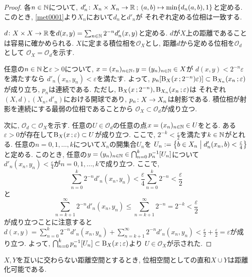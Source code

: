 \documentclass[uplatex, dvipdfmx, a4paper, 12pt, class=jsbook, crop=false]{standalone}
\begin{document}
\begin{proof}
	各$ n \in \mathbb{N} $について, $ \morphto{d'_n}{X_n \times X_n}{\R}
	{(a,b)}{\min\lrbrace{d_n(a,b), 1}} $と定める.
	このとき, \cref{met0001}より$ X_n $において$ d_n $と$ d'_n $が
	それぞれ定める位相は一致する.

	$ d\colon X \times X\to\mathbb{R} $を$ d(x, y) = \sum_{n \in \mathbb{N}}
	2^{-n} d'_n(x, y) $と定める.
	$ d $が$ X $上の距離であることは容易に確かめられる.
	$ X $に定まる積位相を$ \mathcal{O}_X $とし,
	距離$ d $から定める位相を$ \mathcal{O}_d $として
	$ \mathcal{O}_X = \mathcal{O}_d $を示す.

	任意の$ n \in \mathbb{N} $と$ \varepsilon > 0 $について,
	$ x=(x_n)_{n \in \mathbb{N}}, y=(y_n)_{n \in \mathbb{N}} \in X $が
	$ d(x, y) < 2^{-n}\varepsilon $を満たすなら
	$ d'_n(x_n, y_n) < \varepsilon $を満たす.
	よって, $ \mapset{p_n}{\topballsf{X}{x}{2^{-n}} \varepsilon)} \subset
	\topballsf{X_n}{x_n}{\varepsilon} $が成り立ち, $ p_n $は連続である.
	ただし, $ \topballsf{X}{x}{2^{-n}}, \topballsf{X_n}{x_n}{\varepsilon} $は
	それぞれ$ (X, d), (X_n, d'_n) $における開球であり,
	$ p_n\colon X\to X_n $は射影である.
	積位相が射影を連続にする最弱の位相であることから
	$ \mathcal{O}_X \subset \mathcal{O}_d $が成り立つ.

	次に, $ \mathcal{O}_d \subset \mathcal{O}_X $を示す.
	任意の$ U \in \mathcal{O}_d $の任意の点$ x=(x_n)_{n \in \mathbb{N}} \in U $をとる.
	ある$ \varepsilon > 0 $が存在して$ \topballsf{X}{x}{\varepsilon} \subset U $が成り立つ.
	ここで, $ 2^{-k} < \frac{\varepsilon}{2} $を満たす$ k \in \mathbb{N} $がとれる.
	任意の$ n =0, 1, \ldots, k $について$ X_n $の開集合$ U_n $を
	$ U_n \defeq \setcomp{b \in X_n}{d'_n(x_n, b) < \frac{\varepsilon}{4}} $と定める.
	このとき, 任意の$ y=(y_n)_{n \in \N} \in
	\bigcap_{n=0}^k \mapinvset{p_n}{U_n} $について
	$ d'_n(x_n, y_n) < \frac{\varepsilon}{4} $が$ n = 0, 1, \ldots, k $で成り立つ.
	ここで,
	\[ \sum_{n=0}^{k} 2^{-n} d'_n(x_n, y_n) <
	\frac{\varepsilon}{4}\sum_{n=0}^{k} 2^{-n} < \frac{\varepsilon}{2} \]と
	\[ \sum_{n=k+1}^\infty 2^{-n} d'_n(x_n, y_n) \leq \sum_{n=k+1}^\infty 2^{-n}
	= 2^{-k} < \frac{\varepsilon}{2} \]が成り立つことに注意すると
	$ d(x, y) = \sum_{n=0}^{k} 2^{-n} d'_n(x_n, y_n) +
	\sum_{n=k+1}^\infty 2^{-n} d'_n(x_n, y_n) < \frac{\varepsilon}{2} +
	\frac{\varepsilon}{2} = \varepsilon $が成り立つ.
	よって, $ \bigcap_{n=0}^k \mapinvset{p_n}{U_n} \subset \topballsf{X}{x}{\varepsilon} $より
	$ U \in \mathcal{O}_X $が示された.
\end{proof}

\begin{proposition}
	$ X, Y $を互いに交わらない距離空間とするとき,
	位相空間としての直和$ X \cup Y $は距離化可能である.
\end{proposition}
\end{document}
